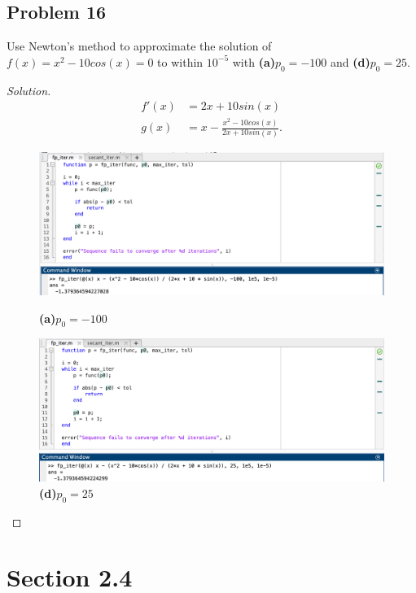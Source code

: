 \documentclass{article}
\begin{document}
\subsection*{Problem 16}
Use Newton's method to approximate the solution of $f(x)=x^2-10cos(x)= 0$ to within $10^{-5}$ with 
\textbf{(a)}$p_0 = -100$ and \textbf{(d)}$p_0 = 25$.
\begin{proof}[Solution]
    \begin{align*}
        f'(x) & = 2x + 10sin(x) \\
        g(x) & = x - \frac{x^2-10cos(x)}{2x+10sin(x)}.
    \end{align*}
    \begin{figure}[htb]
        \qquad
        \begin{minipage}{.4\textwidth}
            \centering
            \includegraphics[scale=0.2]{2.3.16a.png}
            \caption{\textbf{(a)}$p_0 = -100$}
        \end{minipage}    
        \qquad
        \begin{minipage}{.4\textwidth}
            \centering
            \includegraphics[scale=0.2]{2.3.16d.png}
            \caption{\textbf{(d)}$p_0 = 25$}
        \end{minipage}        
    \end{figure} 
\end{proof}

\newpage
\section*{Section 2.4}
\end{document}
